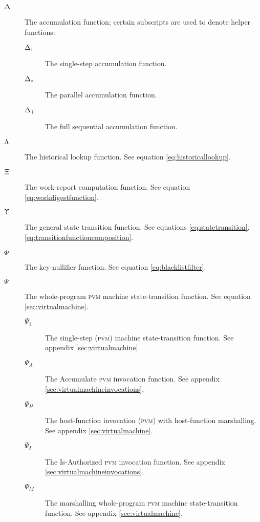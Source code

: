 \begin{description}
  \item[$\Delta$] The accumulation function; certain subscripts are used to denote helper functions: %
  \begin{description}
    \item[$\Delta_1$] The single-step accumulation function.
    \item[$\Delta_*$] The parallel accumulation function.
    \item[$\Delta_+$] The full sequential accumulation function.
  \end{description}
  \item[$\Lambda$] The historical lookup function. See equation \ref{eq:historicallookup}. %
  \item[$\Xi$] The work-report computation function. See equation \ref{eq:workdigestfunction}. %
  \item[$\Upsilon$] The general state transition function. See equations \ref{eq:statetransition}, \ref{eq:transitionfunctioncomposition}. %
  \item[$\Phi$] The key-nullifier function. See equation \ref{eq:blacklistfilter}. %
  \item[$\Psi$] The whole-program \textsc{pvm} machine state-transition function. See equation \ref{sec:virtualmachine}. %
  \begin{description}
    \item[$\Psi_1$] The single-step (\textsc{pvm}) machine state-transition function. See appendix \ref{sec:virtualmachine}. %
    \item[$\Psi_A$] The Accumulate \textsc{pvm} invocation function. See appendix \ref{sec:virtualmachineinvocations}.
    \item[$\Psi_H$] The host-function invocation (\textsc{pvm}) with host-function marshalling. See appendix \ref{sec:virtualmachine}. %
    \item[$\Psi_I$] The Is-Authorized \textsc{pvm} invocation function. See appendix \ref{sec:virtualmachineinvocations}.
    \item[$\Psi_M$] The marshalling whole-program \textsc{pvm} machine state-transition function. See appendix \ref{sec:virtualmachine}. %

\end{description}
\end{description}
